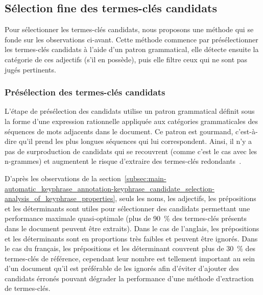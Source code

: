     \subsection{Sélection fine des termes-clés candidats}
    \label{subsec:main-automatic_keyphrase_annotation-keyphrase_candidate_selection-modifiers_filtering}
      Pour sélectionner les termes-clés candidats, nous proposons une méthode
      qui se fonde sur les observations ci-avant. Cette méthode commence par
      présélectionner les termes-clés candidats à l'aide d'un patron
      grammatical, elle détecte ensuite la catégorie de ces adjectifs (s'il en
      possède), puis elle filtre ceux qui ne sont pas jugés pertinents.

      \subsubsection{Présélection des termes-clés candidats}
      \label{subsubsec:main-automatic_keyphrase_annotation-keyphrase_candidate_selection-modifiers_filtering-candidate_pre_selection}
        L'étape de présélection des candidats utilise un patron grammatical
        définit sous la forme d'une expression rationnelle appliquée aux
        catégories grammaticales des séquences de mots adjacents dans le
        document. Ce patron est gourmand, c'est-à-dire qu'il prend les plus
        longues séquences qui lui correspondent. Ainsi, il n'y a pas de
        surproduction de candidats qui se recouvrent (comme c'est le cas avec
        les n-grammes) et augmentent le risque d'extraire des termes-clés
        redondants~\cite{hasan2014state_of_the_art}.

        D'après les observations de la
        section~\ref{subsec:main-automatic_keyphrase_annotation-keyphrase_candidate_selection-analysis_of_keyphrase_properties},
        seuls les noms, les adjectifs, les prépositions et les déterminants sont
        utiles pour sélectionner des candidats permettant une performance
        maximale quasi-optimale (plus de 90~\% des termes-clés présents dans le
        document peuvent être extraits). Dans le cas de l'anglais, les
        prépositions et les déterminants sont en proportions très faibles et
        peuvent être ignorés. Dans le cas du français, les prépositions et les
        déterminant couvrent plus de 30~\% des termes-clés de référence,
        cependant leur nombre est tellement important au sein d'un document
        qu'il est préférable de les ignorés afin d'éviter d'ajouter des
        candidats érronés pouvant dégrader la performance d'une méthode
        d'extraction de termes-clés.
        
